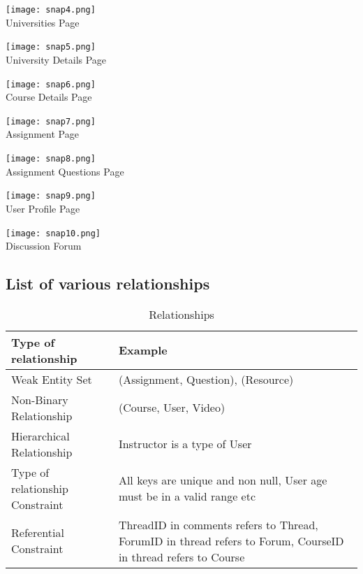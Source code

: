 \documentclass[10pt]{article}
\begin{document}
\begin{center}
\texttt{[image: snap4.png]}{\\Universities Page}
\end{center}
\begin{center}
\texttt{[image: snap5.png]}{\\University Details Page}
\end{center}
\begin{center}
\texttt{[image: snap6.png]}{\\Course Details Page}
\end{center}
\begin{center}
\texttt{[image: snap7.png]}{\\Assignment Page}
\end{center}
\begin{center}
\texttt{[image: snap8.png]}{\\Assignment Questions Page}
\end{center}
\begin{center}
\texttt{[image: snap9.png]}{\\User Profile Page}
\end{center}
\begin{center}
\texttt{[image: snap10.png]}{\\Discussion Forum}
\end{center}

\subsection{List of various relationships}
\begin{table}[h!]
\centering
\caption{Relationships}
  \label{tab:table}
  \vspace{5mm}
  \begin{tabular}{|p{4cm}|p{10cm}|}
  \hline
  Type of relationship & Example\\
  \hline
  Weak Entity Set & (Assignment, Question), (Resource)\\
  \hline
  Non-Binary Relationship & (Course, User, Video)\\
  \hline
  Hierarchical Relationship & Instructor is a type of User\\
  \hline
  Type of relationship Constraint & All keys are unique and non null, User age must be in a valid range etc \\
  \hline
  Referential Constraint & ThreadID in comments refers to Thread, ForumID in thread refers to Forum, CourseID in thread refers to Course \\
  \hline
  \end{tabular}
\end{table}
\end{document}
